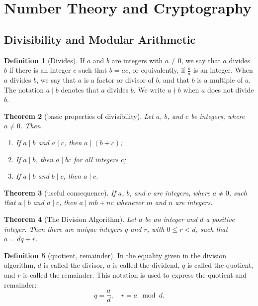 \documentclass[letterpaper,10pt]{article}
\theoremstyle{plain}
\newtheorem{thm}{Theorem}[section]
\theoremstyle{definition}
\newtheorem{defn}[thm]{Definition}
\theoremstyle{remark}
\begin{document}
\pagestyle{fancy}
\section{Number Theory and Cryptography}
\subsection{Divisibility and Modular Arithmetic}
\begin{defn}[Divides]
If \(a\) and \(b\) are integers with \(a \neq 0\), we say that \(a\) divides \(b\) if there is an integer \(c\) such that \(b = ac\), or equivalently, if \(\frac{b}{a}\) is an integer. When \(a\) divides \(b\), we say that \(a\) is a factor or divisor of \(b\), and that \(b\) is a multiple of \(a\). The notation \(a \mid b\) denotes that \(a\) divides \(b\). We write \(a \nmid b\) when \(a\) does not divide \(b\).

\end{defn}
\begin{thm}[basic properties of divisibility]
Let \(a\), \(b\), and \(c\) be integers, where \(a \neq 0\). Then
\begin{enumerate}
    \item[(i)] If \(a \mid b\) and \(a \mid c\), then \(a \mid (b + c)\);
    \item[(ii)] If \(a \mid b\), then \(a \mid bc\) for all integers \(c\);
    \item[(iii)] If \(a \mid b\) and \(b \mid c\), then \(a \mid c\).
\end{enumerate}

\end{thm}
\begin{thm}[useful consequence]
If \(a\), \(b\), and \(c\) are integers, where \(a \neq 0\), such that \(a \mid b\) and \(a \mid c\), then \(a \mid mb + nc\) whenever \(m\) and \(n\) are integers.


\end{thm}

\begin{thm}[The Division Algorithm]
Let \(a\) be an integer and \(d\) a positive integer. Then there are unique integers \(q\) and \(r\), with \(0 \leq r < d\), such that \(a = dq + r\).

\end{thm}
\begin{defn}[quotient, remainder]
In the equality given in the division algorithm, \(d\) is called the divisor, \(a\) is called the dividend, \(q\) is called the quotient, and \(r\) is called the remainder. This notation is used to express the quotient and remainder:
\[q = \frac{a}{d}, \quad r = a \mod d.\]


\end{defn}
\end{document}
